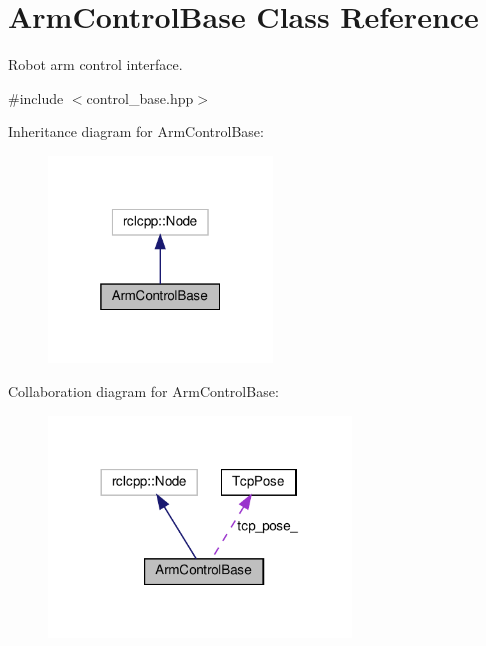 \hypertarget{classArmControlBase}{}\section{Arm\+Control\+Base Class Reference}
\label{classArmControlBase}


Robot arm control interface.  




{\ttfamily \#include $<$control\+\_\+base.\+hpp$>$}



Inheritance diagram for Arm\+Control\+Base\+:
\nopagebreak
\begin{figure}[H]
\begin{center}
\leavevmode
\includegraphics[width=169pt]{classArmControlBase__inherit__graph}
\end{center}
\end{figure}


Collaboration diagram for Arm\+Control\+Base\+:
\nopagebreak
\begin{figure}[H]
\begin{center}
\leavevmode
\includegraphics[width=228pt]{classArmControlBase__coll__graph}
\end{center}
\end{figure}
